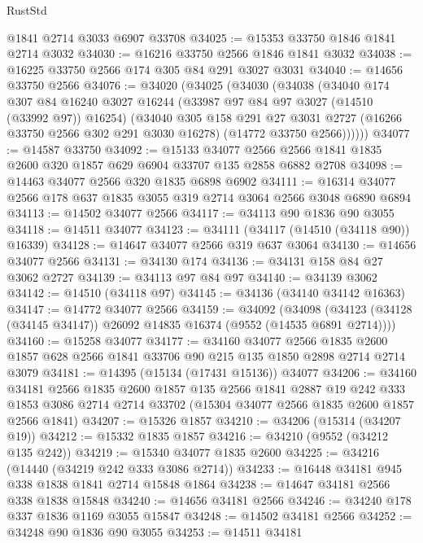 \begin{lexlean}{RustStd}
\begin{coremodule}
    @1841
    @2714
    @3033
    @6907
    @33708
@34025 := @15353 @33750 @1846 @1841 @2714 @3032
@34030 := @16216 @33750 @2566 @1846 @1841 @3032
@34038 := @16225 @33750 @2566 @174 @305 @84 @291 @3027 @3031
@34040 := @14656 @33750 @2566
@34076 := @34020
    (@34025
      (@34030
        (@34038
          (@34040
            @174
            @307
            @84
            @16240
            @3027
            @16244
            (@33987 @97 @84 @97 @3027 (@14510 (@33992 @97)) @16254)
            (@34040
              @305
              @158
              @291
              @27
              @3031
              @2727
              (@16266 @33750 @2566 @302 @291 @3030 @16278)
              (@14772 @33750 @2566))))))
@34077 := @14587 @33750
@34092 := @15133
    @34077
    @2566
    @2566
    @1841
    @1835
    @2600
    @320
    @1857
    @629
    @6904
    @33707
    @135
    @2858
    @6882
    @2708
@34098 := @14463 @34077 @2566 @320 @1835 @6898 @6902
@34111 := @16314 @34077 @2566 @178 @637 @1835 @3055 @319 @2714 @3064 @2566 @3048 @6890 @6894
@34113 := @14502 @34077 @2566
@34117 := @34113 @90 @1836 @90 @3055
@34118 := @14511 @34077
@34123 := @34111 (@34117 (@14510 (@34118 @90)) @16339)
@34128 := @14647 @34077 @2566 @319 @637 @3064
@34130 := @14656 @34077 @2566
@34131 := @34130 @174
@34136 := @34131 @158 @84 @27 @3062 @2727
@34139 := @34113 @97 @84 @97
@34140 := @34139 @3062
@34142 := @14510 (@34118 @97)
@34145 := @34136 (@34140 @34142 @16363)
@34147 := @14772 @34077 @2566
@34159 := @34092
    (@34098 (@34123 (@34128 (@34145 @34147)) @26092 @14835 @16374 (@9552 (@14535 @6891 @2714))))
@34160 := @15258 @34077
@34177 := @34160
    @34077
    @2566
    @1835
    @2600
    @1857
    @628
    @2566
    @1841
    @33706
    @90
    @215
    @135
    @1850
    @2898
    @2714
    @2714
    @3079
@34181 := @14395 (@15134 (@17431 @15136)) @34077
@34206 := @34160
    @34181
    @2566
    @1835
    @2600
    @1857
    @135
    @2566
    @1841
    @2887
    @19
    @242
    @333
    @1853
    @3086
    @2714
    @2714
    @33702
    (@15304 @34077 @2566 @1835 @2600 @1857 @2566 @1841)
@34207 := @15326 @1857
@34210 := @34206 (@15314 (@34207 @19))
@34212 := @15332 @1835 @1857
@34216 := @34210 (@9552 (@34212 @135 @242))
@34219 := @15340 @34077 @1835 @2600
@34225 := @34216 (@14440 (@34219 @242 @333 @3086 @2714))
@34233 := @16448 @34181 @945 @338 @1838 @1841 @2714 @15848 @1864
@34238 := @14647 @34181 @2566 @338 @1838 @15848
@34240 := @14656 @34181 @2566
@34246 := @34240 @178 @337 @1836 @1169 @3055 @15847
@34248 := @14502 @34181 @2566
@34252 := @34248 @90 @1836 @90 @3055
@34253 := @14511 @34181

\end{coremodule}
\end{lexlean}
